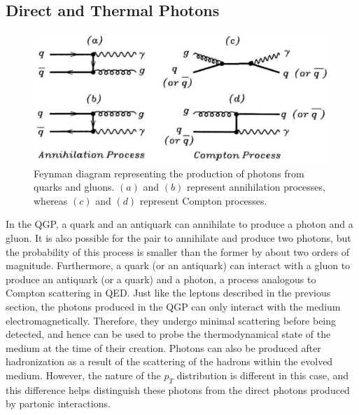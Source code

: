 \subsection{Direct and Thermal Photons}
\begin{figure}[h]
  \centering
  \includegraphics[width=6.5in]{figures/directPhotons.PNG}
  \caption{Feynman diagram representing the production of photons from quarks and gluons. $(a)$ and $(b)$ represent annihilation processes, whereas $(c)$ and $(d)$ represent Compton processes.\cite{wong1994introduction}}\label{fig:directPhotons}
\end{figure}

In the QGP, a quark and an antiquark can annihilate to produce a photon and a gluon. It is also possible for the pair to annihilate and produce two photons, but the probability of this process is smaller than the former by about two orders of magnitude. Furthermore, a quark (or an antiquark) can interact with a gluon to produce an antiquark (or a quark) and a photon, a process analogous to Compton scattering in QED. Just like the leptons described in the previous section, the photons produced in the QGP can only interact with the medium electromagnetically. Therefore, they undergo minimal scattering before being detected, and hence can be used to probe the thermodynamical state of the medium at the time of their creation.\cite{wong1994introduction} Photons can also be produced after hadronization as a result of the scattering of the hadrons within the evolved medium. However, the nature of the $p_{T}$ distribution is different in this case, and this difference helps distinguish these photons from the direct photons produced by partonic interactions.\cite{Wilde:2012wc}

